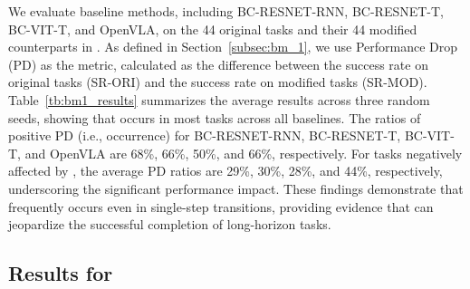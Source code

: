 We evaluate baseline methods, including BC-RESNET-RNN, BC-RESNET-T, BC-VIT-T, and OpenVLA, on the 44 original tasks and their 44 modified counterparts in \taskoriginal{}. As defined in Section~\ref{subsec:bm_1}, we use Performance Drop (PD) as the metric, calculated as the difference between the success rate on original tasks (SR-ORI) and the success rate on modified tasks (SR-MOD). Table~\ref{tb:bm1_results} summarizes the average results across three random seeds, showing that \pb occurs in most tasks across all baselines. The ratios of positive PD (i.e., \pb occurrence) for BC-RESNET-RNN, BC-RESNET-T, BC-VIT-T, and OpenVLA are 68\%, 66\%, 50\%, and 66\%, respectively. For tasks negatively affected by \pb, the average PD ratios are 29\%, 30\%, 28\%, and 44\%, respectively, underscoring the significant performance impact. These findings demonstrate that \pb frequently occurs even in single-step transitions, providing evidence that \pb can jeopardize the successful completion of long-horizon tasks. 



\subsection{Results for \bmb}
\label{subsec:results_bmb}



